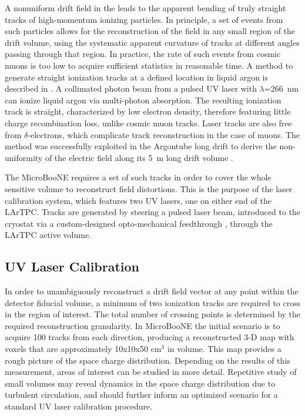 A nonuniform drift field in the \lartpc leads to the apparent bending of truly straight tracks of high-momentum ionizing particles. In principle, a set of events from such particles allows for the reconstruction of the field in any small region of the \lartpc drift volume, using the systematic apparent curvature of tracks at different angles passing through that region. In practice, the rate of such events from cosmic muons is too low to acquire sufficient statistics in reasonable time. A method to generate straight ionization tracks at a defined location in liquid argon is described in \cite{Badhrees:2010}. A collimated photon beam from a pulsed UV laser with $\lambda$=266~nm can ionize liquid argon via multi-photon absorption. The resulting ionization track is straight, characterized by low electron density, therefore featuring little charge recombination loss, unlike cosmic muon tracks. Laser tracks are also free from $\delta$-electrons, which complicate track reconstruction in the case of muons. The method was successfully exploited in the Argontube long drift \lartpc \cite{Badhrees:2012-argontube,Ereditato:2013-argontube,Zeller:2013-argontube} to derive the non-uniformity of the electric field along its 5~m long drift volume \cite{Ereditato:2014-argontubedrift}. 

The MicroBooNE \lartpc requires a set of such tracks in order to cover the whole sensitive volume to reconstruct field distortions. This is the purpose of the laser calibration system, which features two UV lasers, one on either end of the LArTPC.  Tracks are generated by steering a pulsed laser beam, introduced to the cryostat via a custom-designed opto-mechanical feedthrough \cite{Ereditato:2014-laser}, through the LArTPC active volume.   

\subsection{UV Laser Calibration}
In order to unambiguously reconstruct a drift field vector at any point within the detector fiducial volume, a minimum of two ionization tracks are required to cross in the region of interest. The total number of crossing points is determined by the required reconstruction granularity. In MicroBooNE the initial scenario is to acquire 100 tracks from each direction, producing a reconstructed 3-D map with voxels that are approximately 10x10x50 cm$^3$ in volume. This map provides a rough picture of the space charge distribution. Depending on the results of this measurement, areas of interest can be studied in more detail. Repetitive study of small volumes may reveal dynamics in the space charge distribution due to turbulent circulation, and should further inform an optimized scenario for a standard UV laser calibration procedure.  

